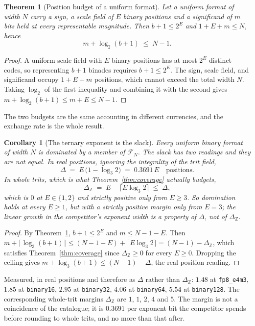 \documentclass[11pt]{article}
\newtheorem{theorem}{Theorem}
\newtheorem{corollary}{Corollary}
\theoremstyle{definition}
\begin{document}
\begin{theorem}[Position budget of a uniform format]
\label{thm:budget}
Let a \emph{uniform} format of width $N$ carry a sign, a scale field of $E$ binary
positions and a significand of $m$ bits held at every representable magnitude.
Then $b+1 \le 2^{E}$ and $1+E+m \le N$, hence
\[
  m + \log_2(b+1) \;\le\; N-1 .
\]
\end{theorem}
\begin{proof}
A uniform scale field with $E$ binary positions has at most $2^{E}$ distinct
codes, so representing $b+1$ binades requires $b+1\leq2^E$.  The sign, scale
field, and significand occupy $1+E+m$ positions, which cannot exceed the total
width $N$.  Taking $\log_2$ of the first inequality and combining it with the
second gives
$ m+\log_2(b+1)\leq m+E\leq N-1$.
\end{proof}

The two budgets are the same accounting in different currencies, and the exchange
rate is the whole result.

\begin{corollary}[The ternary exponent is the slack]
\label{cor:slack}
Every uniform binary format of width $N$ is dominated by a member of
$\mathcal{F}_N$. The slack has two readings and they are not equal. In real
positions, ignoring the integrality of the trit field,
\[
  \Delta \;=\; E\,\bigl(1 - \log_3 2\bigr) \;=\; 0.3691\,E \quad\text{positions}.
\]
In whole trits, which is what Theorem~\ref{thm:coverage} actually budgets,
\[
  \Delta_{\mathbb{Z}} \;=\; E - \bigl\lceil E\log_3 2 \bigr\rceil
  \;\le\; \Delta ,
\]
which is $0$ at $E \in \{1,2\}$ and strictly positive only from $E \ge 3$. So
domination holds at every $E \ge 1$, but with a strictly positive margin only from
$E = 3$; the linear growth in the competitor's exponent width is a property of
$\Delta$, not of $\Delta_{\mathbb{Z}}$.
\end{corollary}
\begin{proof}
By Theorem~\ref{thm:budget}, $b+1 \le 2^E$ and $m \le N-1-E$. Then
$m + \lceil\log_3(b+1)\rceil \le (N-1-E) + \lceil E\log_3 2\rceil
= (N-1) - \Delta_{\mathbb{Z}}$, which satisfies Theorem~\ref{thm:coverage} since
$\Delta_{\mathbb{Z}} \ge 0$ for every $E \ge 0$. Dropping the ceiling gives
$m + \log_3(b+1) \le (N-1) - \Delta$, the real-position reading.
\end{proof}

Measured, in real positions and therefore as $\Delta$ rather than
$\Delta_{\mathbb{Z}}$: $1.48$ at \texttt{fp8\_e4m3}, $1.85$ at
\texttt{binary16}, $2.95$ at \texttt{binary32}, $4.06$ at \texttt{binary64},
$5.54$ at \texttt{binary128}. The corresponding whole-trit margins
$\Delta_{\mathbb{Z}}$ are $1$, $1$, $2$, $4$ and $5$. The margin is not a
coincidence of the catalogue; it is $0.3691$ per exponent bit the competitor
spends before rounding to whole trits, and no more than that after.
\end{document}
